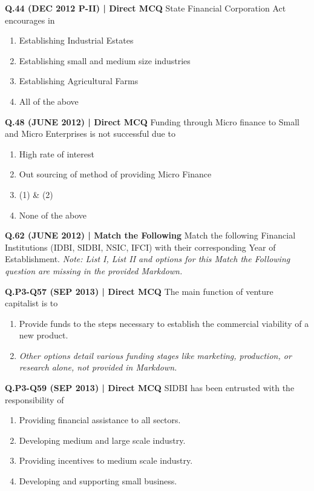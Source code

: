 \documentclass{article}
\begin{document}
\textbf{Q.44 (DEC 2012 P-II) | Direct MCQ}
State Financial Corporation Act encourages in
\begin{enumerate}[label=(\arabic*)]
    \item Establishing Industrial Estates
    \item Establishing small and medium size industries
    \item Establishing Agricultural Farms
    \item All of the above
\end{enumerate}

\textbf{Q.48 (JUNE 2012) | Direct MCQ}
Funding through Micro finance to Small and Micro Enterprises is not successful due to
\begin{enumerate}[label=(\arabic*)]
    \item High rate of interest
    \item Out sourcing of method of providing Micro Finance
    \item (1) \& (2)
    \item None of the above
\end{enumerate}

\textbf{Q.62 (JUNE 2012) | Match the Following}
Match the following Financial Institutions (IDBI, SIDBI, NSIC, IFCI) with their corresponding Year of Establishment.
\emph{Note: List I, List II and options for this Match the Following question are missing in the provided Markdown.}

\textbf{Q.P3-Q57 (SEP 2013) | Direct MCQ}
The main function of venture capitalist is to
\begin{enumerate}[label=(\arabic*)]
    \item Provide funds to the steps necessary to establish the commercial viability of a new product.
    \item \emph{Other options detail various funding stages like marketing, production, or research alone, not provided in Markdown.}
\end{enumerate}

\textbf{Q.P3-Q59 (SEP 2013) | Direct MCQ}
SIDBI has been entrusted with the responsibility of
\begin{enumerate}[label=(\arabic*)]
    \item Providing financial assistance to all sectors.
    \item Developing medium and large scale industry.
    \item Providing incentives to medium scale industry.
    \item Developing and supporting small business.
\end{enumerate}
\end{document}
